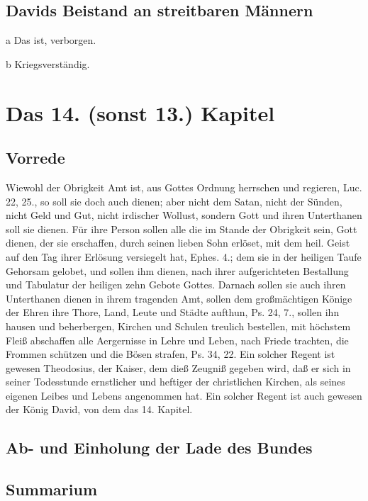\section{Davids Beistand an streitbaren Männern}

a Das ist, verborgen.

b Kriegsverständig.

\chapter{Das 14. (sonst 13.) Kapitel}

\section{Vorrede}

Wiewohl der Obrigkeit Amt ist, aus Gottes Ordnung herrschen und regieren, Luc. 22, 25., so soll sie doch auch dienen; aber nicht dem Satan, nicht der Sünden, nicht Geld und Gut, nicht irdischer Wollust, sondern Gott und ihren Unterthanen soll sie dienen. Für ihre Person sollen alle die im Stande der Obrigkeit sein, Gott dienen, der sie erschaffen, durch seinen lieben Sohn erlöset, mit dem heil. Geist auf den Tag ihrer Erlösung versiegelt hat, Ephes. 4.; dem sie in der heiligen Taufe Gehorsam gelobet, und sollen ihm dienen, nach ihrer aufgerichteten Bestallung und Tabulatur der heiligen zehn Gebote Gottes. Darnach sollen sie auch ihren Unterthanen dienen in ihrem tragenden Amt, sollen dem großmächtigen Könige der Ehren ihre Thore, Land, Leute und Städte aufthun, Ps. 24, 7., sollen ihn hausen und beherbergen, Kirchen und Schulen treulich bestellen, mit höchstem Fleiß abschaffen alle Aergernisse in Lehre und Leben, nach Friede trachten, die Frommen schützen und die Bösen strafen, Ps. 34, 22. Ein solcher Regent ist gewesen Theodosius, der Kaiser, dem dieß Zeugniß gegeben wird, daß er sich in seiner Todesstunde ernstlicher und heftiger der christlichen Kirchen, als seines eigenen Leibes und Lebens angenommen hat. Ein solcher Regent ist auch gewesen der König David, von dem das 14. Kapitel.

\section[Ab- und Einholung der Lade des Bundes]{Ab- und Einholung der Lade des Bundes}

\section{Summarium}

